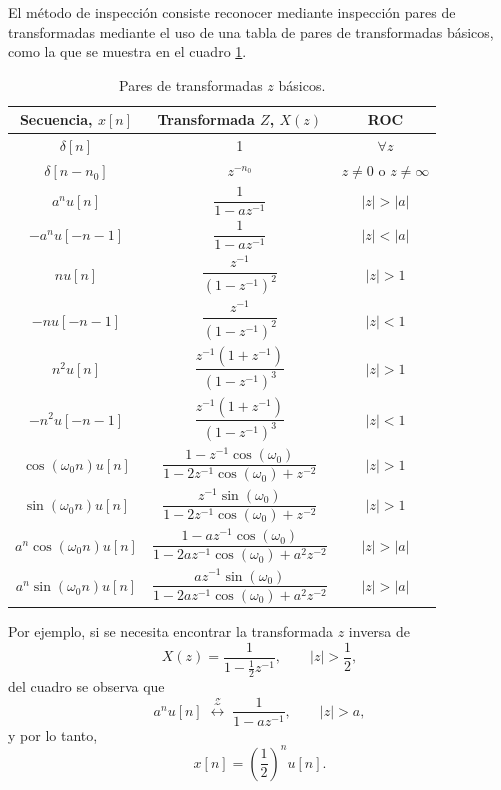 \documentclass[a4paper]{report}
\begin{document}
El método de inspección consiste reconocer mediante inspección pares de transformadas mediante el uso de una tabla de pares de transformadas básicos, como la que se muestra en el cuadro \ref{tab:z_transform_pairs}.
\begin{table}[ht!]
\begin{center}
\begin{tabular}{ccc}\hline
Secuencia, \(x[n]\) & Transformada \(Z\), \(X(z)\) & ROC \\ \hline
\(\delta[n]\)  &  1  & \(\forall z\) \\[\bigskipamount]
\(\delta[n-n_0]\) & 	\(z^{-n_0}\) & \(z \neq 0\textrm{ o }z\neq\infty\)\\[\bigskipamount]
\(a^n u[n]\)   &  \(\dfrac{1}{1-a z^{-1}}\) & \(|z| > |a|\)\\[\bigskipamount]
\(-a^n u[-n-1]\)  &  \(\dfrac{1}{1-a z^{-1}}\)   & \(|z| < |a|\)\\[\bigskipamount]
\(n u[n]\)  & \(\dfrac{z^{-1}}{( 1-z^{-1} )^2}\)  &  \(|z| > 1\)\\[\bigskipamount]
\(- n u[-n-1]\)  &  \(\dfrac{z^{-1} }{ (1 - z^{-1})^2 }\)  & \(|z| < 1\)\\[\bigskipamount]
\(n^2 u[n]\)  & \(\dfrac{ z^{-1} (1 + z^{-1} )}{(1 - z^{-1})^3}\) &  \(|z| > 1\)\\[\bigskipamount]
\(-n^2 u[-n - 1]\)  &  \(\dfrac{ z^{-1} (1 + z^{-1} )}{(1 - z^{-1})^3}\) & \(|z| < 1\)\\[\bigskipamount]
\(\cos(\omega_0 n) u[n]\)  & \(\dfrac{ 1-z^{-1} \cos(\omega_0)}{ 1-2z^{-1}\cos(\omega_0)+ z^{-2}}\) & \(|z| >1\)\\[\bigskipamount]
\(\sin(\omega_0 n) u[n]\) & \(\dfrac{ z^{-1} \sin(\omega_0)}{ 1-2z^{-1}\cos(\omega_0)+ z^{-2}}\) & \(|z| >1\)\\[\bigskipamount]
\(a^n \cos(\omega_0 n) u[n]\)  & \(\dfrac{1-a z^{-1} \cos( \omega_0)}{1-2az^{-1}\cos(\omega_0)+ a^2 z^{-2}}\)  & \(|z|>|a|\)\\[\bigskipamount]
\(a^n \sin(\omega_0 n) u[n]\) & \(\dfrac{ az^{-1} \sin(\omega_0) }{ 1-2az^{-1}\cos(\omega_0)+ a^2 z^{-2}}\) & \(|z|>|a|\)
\end{tabular}
\end{center}\caption{Pares de transformadas \(z\) básicos.}\label{tab:z_transform_pairs}
\end{table}
Por ejemplo, si se necesita encontrar la transformada \(z\) inversa de 
\[
 X(z)=\frac{1}{1-\frac{1}{2}z^{-1}},
 \qquad
 |z|>\frac{1}{2},
\]
del cuadro se observa que 
\[
 a^nu[n]\;\overset{\mathcal{Z}}{\longleftrightarrow}\;\frac{1}{1-az^{-1}},
 \qquad
 |z|>a,
\]
y por lo tanto,
\[
 x[n]=\left(\frac{1}{2}\right)^nu[n].
\]
\end{document}
